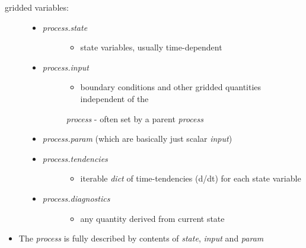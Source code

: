 \documentclass[letterpaper,10pt,english]{sphinxmanual}
\begin{document}
\begin{description}
\item[{gridded variables:}] \leavevmode\begin{itemize}
\item {} \begin{description}
\item[{\emph{process.state}}] \leavevmode\begin{itemize}
\item {} 
state variables, usually time-dependent

\end{itemize}

\end{description}

\item {} \begin{description}
\item[{\emph{process.input}}] \leavevmode\begin{itemize}
\item {} 
boundary conditions and other gridded quantities independent of the

\end{itemize}

\emph{process}
- often set by a parent \emph{process}

\end{description}

\item {} 
\emph{process.param}  (which are basically just scalar \emph{input})

\item {} \begin{description}
\item[{\emph{process.tendencies}}] \leavevmode\begin{itemize}
\item {} 
iterable \emph{dict} of time-tendencies (d/dt) for each state variable

\end{itemize}

\end{description}

\item {} \begin{description}
\item[{\emph{process.diagnostics}}] \leavevmode\begin{itemize}
\item {} 
any quantity derived from current state

\end{itemize}

\end{description}

\end{itemize}

\end{description}
\begin{itemize}
\item {} 
The \emph{process} is fully described by contents of \emph{state}, \emph{input} and \emph{param}

\end{itemize}
\end{document}
